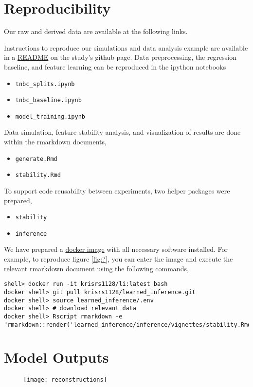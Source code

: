 
\section{Reproducibility}

Our raw and derived data are available at the following links.

Instructions to reproduce our simulations and data analysis example are
available in a \href{https://github.com/krisrs1128/learned_inference}{README} on
the study's github page. Data preprocessing, the regression baseline, and
feature learning can be reproduced in the ipython notebooks

\begin{itemize}
\item \texttt{tnbc\_splits.ipynb}
\item \texttt{tnbc\_baseline.ipynb}
\item \texttt{model\_training.ipynb}
\end{itemize}

Data simulation, feature stability analysis, and visualization of results are
done within the rmarkdown documents,

\begin{itemize}
\item \texttt{generate.Rmd}
\item \texttt{stability.Rmd}
\end{itemize}

To support code reusability between experiments, two helper packages were prepared,

\begin{itemize}
\item \texttt{stability}
\item \texttt{inference}
\end{itemize}

We have prepared a \href{https://hub.docker.com/r/krisrs1128/li}{docker image}
with all necessary software installed. For example, to reproduce figure
\ref{fig:?}, you can enter the image and execute the relevant rmarkdown document
using the following commands,

\begin{verbatim}
shell> docker run -it krisrs1128/li:latest bash
docker shell> git pull krisrs1128/learned_inference.git
docker shell> source learned_inference/.env
docker shell> # download relevant data
docker shell> Rscript rmarkdown -e "rmarkdown::render('learned_inference/inference/vignettes/stability.Rmd')"
\end{verbatim}

\section{Model Outputs}

\begin{figure}
\texttt{[image: reconstructions]}
\caption{}
\label{fig:reconstructions}
\end{figure}
